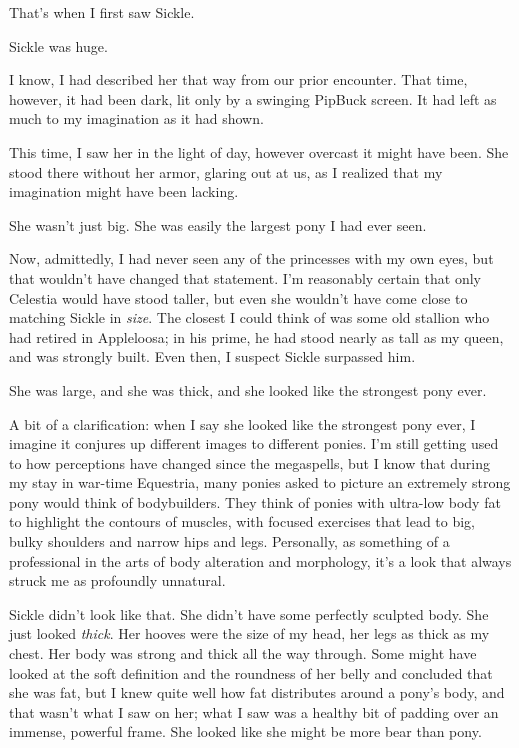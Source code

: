 That’s when I first saw Sickle.

Sickle was huge.

I know, I had described her that way from our prior encounter. That time, however, it had been dark, lit only by a swinging PipBuck screen. It had left as much to my imagination as it had shown.

This time, I saw her in the light of day, however overcast it might have been. She stood there without her armor, glaring out at us, as I realized that my imagination might have been lacking.

She wasn’t just big. She was easily the largest pony I had ever seen.

Now, admittedly, I had never seen any of the princesses with my own eyes, but that wouldn’t have changed that statement. I’m reasonably certain that only Celestia would have stood taller, but even she wouldn’t have come close to matching Sickle in \textit{size}. The closest I could think of was some old stallion who had retired in Appleloosa; in his prime, he had stood nearly as tall as my queen, and was strongly built. Even then, I suspect Sickle surpassed him.

She was large, and she was thick, and she looked like the strongest pony ever.

A bit of a clarification: when I say she looked like the strongest pony ever, I imagine it conjures up different images to different ponies. I’m still getting used to how perceptions have changed since the megaspells, but I know that during my stay in war-time Equestria, many ponies asked to picture an extremely strong pony would think of bodybuilders. They think of ponies with ultra-low body fat to highlight the contours of muscles, with focused exercises that lead to big, bulky shoulders and narrow hips and legs. Personally, as something of a professional in the arts of body alteration and morphology, it’s a look that always struck me as profoundly unnatural.

Sickle didn’t look like that. She didn’t have some perfectly sculpted body. She just looked \textit{thick}. Her hooves were the size of my head, her legs as thick as my chest. Her body was strong and thick all the way through. Some might have looked at the soft definition and the roundness of her belly and concluded that she was fat, but I knew quite well how fat distributes around a pony’s body, and that wasn’t what I saw on her; what I saw was a healthy bit of padding over an immense, powerful frame. She looked like she might be more bear than pony.


